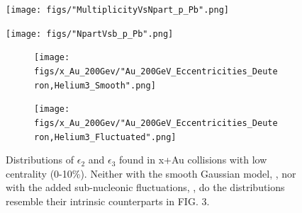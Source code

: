 \documentclass[preprint,showpacs,amsfonts,aps,prl,nofootinbib,floatfix]{revtex4}
\begin{document}
\begin{figure}
	\texttt{[image: figs/"MultiplicityVsNpart\_p\_Pb".png]}
	\caption{}
	\label{fig:MultVsNpart}
\end{figure}

\begin{figure}
	\texttt{[image: figs/"NpartVsb\_p\_Pb".png]}
	\caption{}
	\label{fig:NpartVsb}
\end{figure}

\begin{figure}
	\caption{}
	\label{fig:MultVsB}
\end{figure}


\begin{figure}
	\centering
	\begin{subfigure}[h]{0.4\linewidth}
		\centering
		\texttt{[image: figs/x\_Au\_200Gev/"Au\_200GeV\_Eccentricities\_Deuteron,Helium3\_Smooth".png]}
		\subcaption{\label{subfig:SmCentAu}}
	\end{subfigure}
	\begin{subfigure}[h]{0.4\linewidth}
		\centering
		\texttt{[image: figs/x\_Au\_200Gev/"Au\_200GeV\_Eccentricities\_Deuteron,Helium3\_Fluctuated".png]}
		\subcaption{\label{subfig:FlCentAu}}
	\end{subfigure}
	\caption{Distributions of $\epsilon_2$ and $\epsilon_3$ found in x+Au collisions with low centrality (0-10\%). Neither with the smooth Gaussian model, , nor with the added sub-nucleonic fluctuations, , do the distributions resemble their intrinsic counterparts in FIG. 3.}
	\label{fig:SmFlCentAu}
\end{figure}
\end{document}
